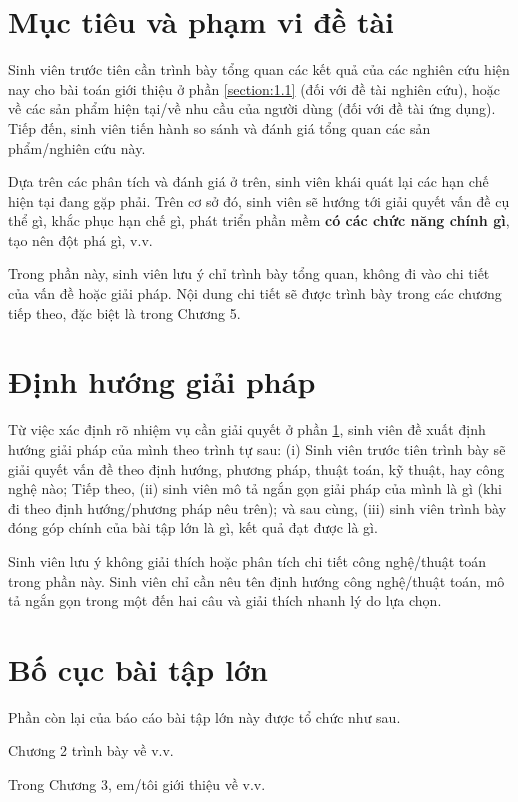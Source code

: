 \documentclass[../BTL.tex]{subfiles}
\begin{document}
\section{Mục tiêu và phạm vi đề tài}
\label{section:1.2}
Sinh viên trước tiên cần trình bày tổng quan các kết quả của các nghiên cứu hiện nay cho bài toán giới thiệu ở phần \ref{section:1.1} (đối với đề tài nghiên cứu), hoặc về các sản phẩm hiện tại/về nhu cầu của người dùng (đối với đề tài ứng dụng). Tiếp đến, sinh viên tiến hành so sánh và đánh giá tổng quan các sản phẩm/nghiên cứu này.

Dựa trên các phân tích và đánh giá ở trên, sinh viên khái quát lại các hạn chế hiện tại đang gặp phải. Trên cơ sở đó, sinh viên sẽ hướng tới giải quyết vấn đề cụ thể gì, khắc phục hạn chế gì, phát triển phần mềm \textbf{có các chức năng chính gì}, tạo nên đột phá gì, v.v.

Trong phần này, sinh viên lưu ý chỉ trình bày tổng quan, không đi vào chi tiết của vấn đề hoặc giải pháp. Nội dung chi tiết sẽ được trình bày trong các chương tiếp theo, đặc biệt là trong Chương 5.

\section{Định hướng giải pháp}
\label{section:1.3}
Từ việc xác định rõ nhiệm vụ cần giải quyết ở phần \ref{section:1.2}, sinh viên đề xuất định hướng giải pháp của mình theo trình tự sau: (i) Sinh viên trước tiên trình bày sẽ giải quyết vấn đề theo định hướng, phương pháp, thuật toán, kỹ thuật, hay công nghệ nào; Tiếp theo, (ii) sinh viên mô tả ngắn gọn giải pháp của mình là gì (khi đi theo định hướng/phương pháp nêu trên); và sau cùng, (iii) sinh viên trình bày đóng góp chính của  bài tập lớn là gì, kết quả đạt được là gì.

Sinh viên lưu ý không giải thích hoặc phân tích chi tiết công nghệ/thuật toán trong phần này. Sinh viên chỉ cần nêu tên định hướng công nghệ/thuật toán, mô tả ngắn gọn trong một đến hai câu và giải thích nhanh lý do lựa chọn.

\section{Bố cục  bài tập lớn}
\label{section:1.4}
Phần còn lại của báo cáo  bài tập lớn này được tổ chức như sau. 

Chương 2 trình bày về v.v. 

Trong Chương 3, em/tôi giới thiệu về v.v.
\end{document}
